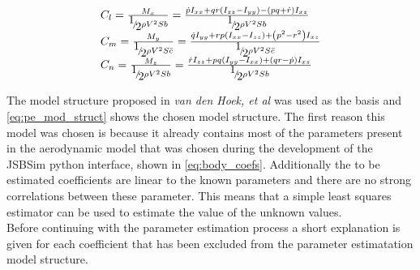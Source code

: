 \begin{equation}
    \begin{array}{l}
        {C_l} = \frac{{{M_x}}}{{{\raise0.7ex\hbox{$1$} \!\mathord{\left/
         {\vphantom {1 2}}\right.\kern-\nulldelimiterspace}
        \!\lower0.7ex\hbox{$2$}}\rho {V^2}Sb}} = \frac{{\dot p{I_{xx}} + qr\left( {{I_{zz}} - {I_{yy}}} \right) - \left( {pq + \dot r} \right){I_{xz}}}}{{{\raise0.7ex\hbox{$1$} \!\mathord{\left/
         {\vphantom {1 2}}\right.\kern-\nulldelimiterspace}
        \!\lower0.7ex\hbox{$2$}}\rho {V^2}Sb}}\\
        {C_m} = \frac{{{M_y}}}{{{\raise0.7ex\hbox{$1$} \!\mathord{\left/
         {\vphantom {1 2}}\right.\kern-\nulldelimiterspace}
        \!\lower0.7ex\hbox{$2$}}\rho {V^2}S\bar c}} = \frac{{\dot q{I_{yy}} + rp\left( {{I_{xx}} - {I_{zz}}} \right) + \left( {{p^2} - {r^2}} \right){I_{xz}}}}{{{\raise0.7ex\hbox{$1$} \!\mathord{\left/
         {\vphantom {1 2}}\right.\kern-\nulldelimiterspace}
        \!\lower0.7ex\hbox{$2$}}\rho {V^2}S\bar c}}\\
        {C_n} = \frac{{{M_z}}}{{{\raise0.7ex\hbox{$1$} \!\mathord{\left/
         {\vphantom {1 2}}\right.\kern-\nulldelimiterspace}
        \!\lower0.7ex\hbox{$2$}}\rho {V^2}Sb}} = \frac{{\dot r{I_{zz}} + pq\left( {{I_{yy}} - {I_{xx}}} \right) + \left( {qr - \dot p} \right){I_{xz}}}}{{{\raise0.7ex\hbox{$1$} \!\mathord{\left/
         {\vphantom {1 2}}\right.\kern-\nulldelimiterspace}
        \!\lower0.7ex\hbox{$2$}}\rho {V^2}Sb}}
        \end{array}
        \label{eq:aero_mom_calc}
\end{equation}

The model structure proposed in \textit{van den Hoek, et al} \cite{van_den_hoek} was used as the basis and \autoref{eq:pe_mod_struct} shows the chosen model structure. The first reason this model was chosen is because it already contains most of the parameters present in the aerodynamic model that was chosen during the development of the JSBSim python interface, shown in \autoref{eq:body_coefs}. Additionally the to be estimated coefficients are linear to the known parameters and there are no strong correlations between these parameter. This means that a simple least squares estimator can be used to estimate the value of the unknown values.\\

Before continuing with the parameter estimation process a short explanation is given for each coefficient that has been excluded from the parameter estimatation model structure.

